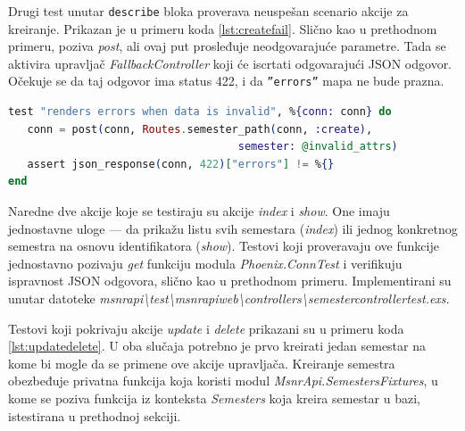 \documentclass[12pt,oneside]{memoir}
\begin{document}
\par Drugi test unutar \texttt{describe} bloka proverava neuspešan scenario akcije za kreiranje. Prikazan je u primeru koda \ref{lst:createfail}. Slično kao u prethodnom primeru, poziva \emph{post}, ali ovaj put prosleđuje neodgovarajuće parametre. Tada se aktivira upravljač \emph{FallbackController} koji će iscrtati odgovarajući JSON odgovor. Očekuje se da taj odgovor ima status 422, i da \texttt{''errors''} mapa ne bude prazna. \\


\begin{minipage}{\linewidth}
\begin{lstlisting}[language=elixir, basicstyle=\small, caption={Testiranje akcije \emph{create} upravljača \emph{SemesterController}},captionpos=b, label={lst:createfail}]
test "renders errors when data is invalid", %{conn: conn} do
   conn = post(conn, Routes.semester_path(conn, :create), 
   				                    semester: @invalid_attrs)
   assert json_response(conn, 422)["errors"] != %{}
end
\end{lstlisting}
\end{minipage}

\par Naredne dve akcije koje se testiraju su akcije \emph{index} i \emph{show}. One imaju jednostavne uloge --- da prikažu listu svih semestara (\emph{index}) ili jednog konkretnog semestra na osnovu identifikatora (\emph{show}). Testovi koji proveravaju ove funkcije jednostavno pozivaju \emph{get} funkciju modula \emph{Phoenix.ConnTest} i verifikuju ispravnost JSON odgovora, slično kao u prethodnom primeru. Implementirani su unutar datoteke \emph{msnr{\textunderscore}api{\textbackslash}test{\textbackslash}msnr{\textunderscore}api{\textunderscore}web{\textbackslash}controllers{\textbackslash}semester{\textunderscore}controller{\textunderscore}test.exs.}

\par Testovi koji pokrivaju akcije \emph{update} i \emph{delete} prikazani su u primeru koda \ref{lst:updatedelete}. U oba slučaja potrebno je prvo kreirati jedan semestar na kome bi  mogle da se primene ove akcije upravljača. Kreiranje semestra obezbeđuje privatna funkcija koja koristi modul \emph{MsnrApi.SemestersFixtures}, u kome se poziva funkcija iz konteksta \emph{Semesters} koja kreira semestar u bazi, istestirana u prethodnoj sekciji.
\end{document}
